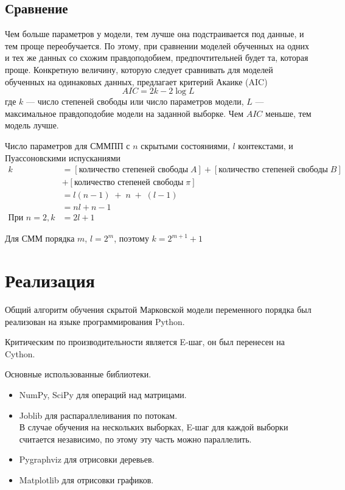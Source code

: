 \documentclass{matmex-diploma-custom}
\begin{document}
\subsection{Сравнение}
Чем больше параметров у модели, тем лучше она подстраивается под данные, и тем проще переобучается. 
По этому, при сравнении моделей обученных на одних и тех же данных со схожим правдоподобием, предпочтительней будет та, которая проще. 
Конкретную величину, которую следует сравнивать для моделей обученных на одинаковых данных, предлагает критерий Акаике (AIC)
$$ AIC = 2k-2\log{L} $$ 
где $ k $ --- число степеней свободы или число параметров модели, $ L $ --- максимальное правдоподобие модели на заданной выборке. Чем $AIC$ меньше, тем модель лучше. 

Число параметров для СММПП с $ n $ скрытыми состояниями, $ l $ контекстами, и Пуассоновскими испусканиями 
\begin{align*}
k &= [\text{количество степеней свободы} \; A ] 
+ [\text{количество степеней свободы} \; B ]
\\&+ [\text{количество степеней свободы} \; \pi ]
\\ &= l(n-1)\;+\;n\;+\;(l-1) \\&= nl + n - 1
\\
\text{При } n=2, k &= 2l + 1
\end{align*}

Для СММ порядка $m$, $l=2^m$, поэтому $k = 2^{m+1}+1$

\section{Реализация}
Общий алгоритм обучения скрытой Марковской модели переменного порядка был реализован на языке программирования Python. 

Критическим по производительности является E-шаг, он был перенесен на Cython.

Основные использованные библиотеки.
\begin{itemize}
\item
NumPy, SciPy для операций над матрицами.
\item
Joblib для распараллеливания по потокам.
\\
В случае обучения на нескольких выборках, E-шаг для каждой выборки считается независимо, по этому эту часть можно параллелить.
\item
Pygraphviz для отрисовки деревьев. 
\item
Matplotlib для отрисовки графиков.
\end{itemize}
\end{document}
